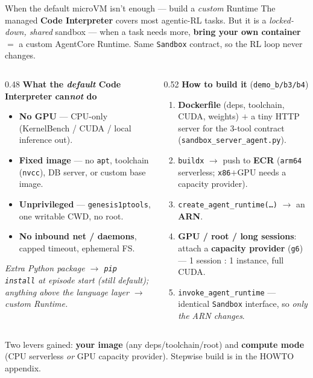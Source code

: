 \documentclass[aspectratio=169]{beamer}
\begin{document}
\begin{frame}{When the default microVM isn't enough --- build a \emph{custom} Runtime}
  \footnotesize The managed \textbf{Code Interpreter} covers most agentic-RL tasks. But it is a
  \emph{locked-down, shared} sandbox --- when a task needs more, \textbf{bring your own container} $=$ a
  custom AgentCore Runtime. Same \texttt{Sandbox} contract, so the RL loop never changes.
  \begin{columns}[T]
    \begin{column}{0.48\textwidth}
      \textbf{What the \emph{default} Code Interpreter can\emph{not} do}
      \begin{itemize}\setlength\itemsep{0.03em}
        \item \textbf{No GPU} --- CPU-only (KernelBench / CUDA / local inference out).
        \item \textbf{Fixed image} --- no \texttt{apt}, toolchain (\texttt{nvcc}), DB server, or custom base image.
        \item \textbf{Unprivileged} --- \texttt{genesis1ptools}, one writable CWD, no root.
        \item \textbf{No inbound net / daemons}, capped timeout, ephemeral FS.
      \end{itemize}
      {\scriptsize\itshape Extra \emph{Python package} $\to$ \texttt{pip install} at episode start (still
        default); anything \emph{above} the language layer $\to$ custom Runtime.}
    \end{column}
    \begin{column}{0.52\textwidth}
      \textbf{How to build it} (\texttt{demo\_b/b3/b4})
      \begin{enumerate}\setlength\itemsep{0.03em}
        \item[\textbf{1}] \textbf{Dockerfile} (deps, toolchain, CUDA, weights) $+$ a tiny HTTP server for
          the 3-tool contract (\texttt{sandbox\_server\_agent.py}).
        \item[\textbf{2}] \texttt{buildx} $\to$ push to \textbf{ECR} (\texttt{arm64} serverless; \texttt{x86}$+$GPU needs a capacity provider).
        \item[\textbf{3}] \texttt{create\_agent\_runtime(\ldots)} $\to$ an \textbf{ARN}.
        \item[\textbf{4}] \textbf{GPU / root / long sessions}: attach a \textbf{capacity provider} (\texttt{g6}) --- 1 session : 1 instance, full CUDA.
        \item[\textbf{5}] \texttt{invoke\_agent\_runtime} --- identical \texttt{Sandbox} interface, so \emph{only the ARN changes}.
      \end{enumerate}
    \end{column}
  \end{columns}
  \vspace{0.1em}
  {\scriptsize Two levers gained: \textbf{your image} (any deps/toolchain/root) and \textbf{compute mode}
  (CPU serverless \emph{or} GPU capacity provider). Stepwise build is in the HOWTO appendix.}
\end{frame}
\end{document}
